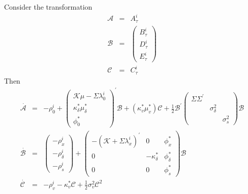 \documentclass{article}
\begin{document}
Consider the transformation%
\begin{eqnarray*}
\mathcal{A} &=&A_{\tau }^{i} \\
\mathcal{B} &=&\left( 
\begin{array}{c}
B_{\tau }^{i} \\ 
D_{\tau }^{i} \\ 
E_{\tau }^{i}%
\end{array}%
\right) \\
\mathcal{C} &=&C_{\tau }^{i}
\end{eqnarray*}%
Then%
\begin{eqnarray*}
\overset{\cdot }{\mathcal{A}} &=&-\rho _{0}^{i}+\left( 
\begin{array}{c}
\mathcal{K\mu }-\Sigma \lambda _{0}^{i} \\ 
\kappa _{\delta }^{\ast }\mu _{\delta }^{\ast } \\ 
\phi _{0}^{\ast }%
\end{array}%
\right) ^{\prime }\mathcal{B+}\left( \kappa _{v}^{\ast }\mu _{v}^{\ast
}\right) \mathcal{C}+\frac{1}{2}\mathcal{B}^{\prime }%
\begin{pmatrix}
\Sigma \Sigma ^{\prime } &  &  \\ 
& \sigma _{\delta }^{2} &  \\ 
&  & \sigma _{s}^{2}%
\end{pmatrix}%
\mathcal{B} \\
\overset{\cdot }{\mathcal{B}} &=&\left( 
\begin{array}{c}
-\rho _{x}^{i} \\ 
-\rho _{\delta }^{i} \\ 
-\rho _{s}^{i}%
\end{array}%
\right) +%
\begin{pmatrix}
-\left( \mathcal{K}+\Sigma \lambda _{x}^{i}\right) ^{\prime } & 0 & \phi
_{x}^{\ast } \\ 
0 & -\kappa _{\delta }^{\ast } & \phi _{\delta }^{\ast } \\ 
0 & 0 & \phi _{s}^{\ast }%
\end{pmatrix}%
\mathcal{B} \\
\overset{\cdot }{\mathcal{C}} &=&-\rho _{v}^{i}-\kappa _{v}^{\ast }\mathcal{C%
}+\frac{1}{2}\sigma _{v}^{2}\mathcal{C}^{2}
\end{eqnarray*}
\end{document}
